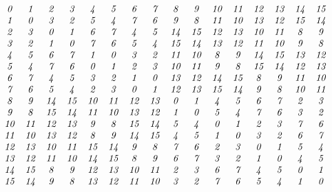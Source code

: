 \documentclass[12pt]{article}
\begin{document}
\begin{displaymath}
\begin{array}{cccccccccccccccc}
\G0  &\G1  &\G2  &\G3  &\G4  &\G5  &\G6  &\G7  &\G8  &\G9 &\G1\G0 &\G1\G1 &\G1\G2 &\G1\G3 &\G1\G4 &\G1\G5 \\
\G1  &\G0  &\G3  &\G2  &\G5  &\G4  &\G7  &\G6  &\G9  &\G8 &\G1\G1 &\G1\G0 &\G1\G3 &\G1\G2 &\G1\G5 &\G1\G4\\
\G2  &\G3  &\G0  &\G1  &\G6  &\G7  &\G4  &\G5 &\G1\G4 &\G1\G5 &\G1\G2 &\G1\G3 &\G1\G0 &\G1\G1  &\G8  &\G9\\
\G3  &\G2  &\G1  &\G0  &\G7  &\G6  &\G5  &\G4 &\G1\G5 &\G1\G4 &\G1\G3 &\G1\G2 &\G1\G1 &\G1\G0  &\G9  &\G8\\
\G4  &\G5  &\G6  &\G7  &\G1  &\G0  &\G3  &\G2 &\G1\G1 &\G1\G0  &\G8  &\G9 &\G1\G4 &\G1\G5 &\G1\G3 &\G1\G2\\
\G5  &\G4  &\G7  &\G6  &\G0  &\G1  &\G2  &\G3 &\G1\G0 &\G1\G1  &\G9  &\G8 &\G1\G5 &\G1\G4 &\G1\G2 &\G1\G3\\
\G6  &\G7  &\G4  &\G5  &\G3  &\G2  &\G1  &\G0 &\G1\G3 &\G1\G2 &\G1\G4 &\G1\G5  &\G8  &\G9 &\G1\G1 &\G1\G0\\
\G7  &\G6  &\G5  &\G4  &\G2  &\G3  &\G0  &\G1 &\G1\G2 &\G1\G3 &\G1\G5 &\G1\G4  &\G9  &\G8 &\G1\G0 &\G1\G1\\
\G8  &\G9 &\G1\G4 &\G1\G5 &\G1\G0 &\G1\G1 &\G1\G2 &\G1\G3  &\G0  &\G1  &\G4  &\G5  &\G6  &\G7  &\G2  &\G3\\
\G9  &\G8 &\G1\G5 &\G1\G4 &\G1\G1 &\G1\G0 &\G1\G3 &\G1\G2  &\G1  &\G0  &\G5  &\G4  &\G7  &\G6  &\G3  &\G2\\
\G1\G0 &\G1\G1 &\G1\G2 &\G1\G3  &\G9  &\G8 &\G1\G5 &\G1\G4  &\G5  &\G4  &\G0  &\G1  &\G2  &\G3  &\G7  &\G6\\
\G1\G1 &\G1\G0 &\G1\G3 &\G1\G2  &\G8  &\G9 &\G1\G4 &\G1\G5  &\G4  &\G5  &\G1  &\G0  &\G3  &\G2  &\G6  &\G7\\
\G1\G2 &\G1\G3 &\G1\G0 &\G1\G1 &\G1\G5 &\G1\G4  &\G9  &\G8  &\G7  &\G6  &\G2  &\G3  &\G0  &\G1  &\G5  &\G4\\
\G1\G3 &\G1\G2 &\G1\G1 &\G1\G0 &\G1\G4 &\G1\G5  &\G8  &\G9  &\G6  &\G7  &\G3  &\G2  &\G1  &\G0  &\G4  &\G5\\
\G1\G4 &\G1\G5  &\G8  &\G9 &\G1\G2 &\G1\G3 &\G1\G0 &\G1\G1  &\G2  &\G3  &\G6  &\G7  &\G4  &\G5  &\G0  &\G1\\
\G1\G5 &\G1\G4  &\G9  &\G8 &\G1\G3 &\G1\G2 &\G1\G1 &\G1\G0  &\G3  &\G2  &\G7  &\G6  &\G5  &\G4  &\G1  &\G0
\end{array}
\end{displaymath}
\end{document}
